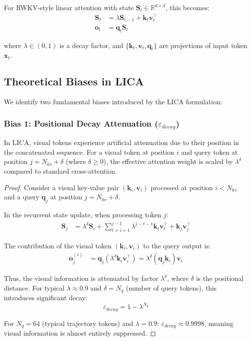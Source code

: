 For RWKV-style linear attention with state $\mathbf{S}_t \in \mathbb{R}^{d \times d}$, this becomes:
\begin{align}
\mathbf{S}_t &= \lambda \mathbf{S}_{t-1} + \mathbf{k}_t \mathbf{v}_t^\top \\
\mathbf{o}_t &= \mathbf{q}_t \mathbf{S}_t
\end{align}

where $\lambda \in (0,1)$ is a decay factor, and $\{\mathbf{k}_t, \mathbf{v}_t, \mathbf{q}_t\}$ are projections of input token $\mathbf{x}_t$.

\subsection{Theoretical Biases in LICA}

We identify two fundamental biases introduced by the LICA formulation:

\subsubsection{Bias 1: Positional Decay Attenuation ($\varepsilon_{decay}$)}

\begin{theorem}
In LICA, visual tokens experience artificial attenuation due to their position in the concatenated sequence. For a visual token at position $i$ and query token at position $j = N_{kv} + \delta$ (where $\delta \geq 0$), the effective attention weight is scaled by $\lambda^{\delta}$ compared to standard cross-attention.
\end{theorem}

\begin{proof}
Consider a visual key-value pair $(\mathbf{k}_i, \mathbf{v}_i)$ processed at position $i < N_{kv}$ and a query $\mathbf{q}_j$ at position $j = N_{kv} + \delta$.

In the recurrent state update, when processing token $j$:
\begin{align}
\mathbf{S}_j &= \lambda^{\delta} \mathbf{S}_i + \sum_{t=i+1}^{j-1} \lambda^{j-t-1} \mathbf{k}_t \mathbf{v}_t^\top + \mathbf{k}_j \mathbf{v}_j^\top
\end{align}

The contribution of the visual token $(\mathbf{k}_i, \mathbf{v}_i)$ to the query output is:
\begin{align}
\mathbf{o}_j^{(i)} &= \mathbf{q}_j (\lambda^{\delta} \mathbf{k}_i \mathbf{v}_i^\top) = \lambda^{\delta} (\mathbf{q}_j \mathbf{k}_i) \mathbf{v}_i
\end{align}

Thus, the visual information is attenuated by factor $\lambda^{\delta}$, where $\delta$ is the positional distance. For typical $\lambda \approx 0.9$ and $\delta = N_q$ (number of query tokens), this introduces significant decay:
\begin{equation}
\varepsilon_{decay} = 1 - \lambda^{N_q}
\end{equation}

For $N_q = 64$ (typical trajectory tokens) and $\lambda = 0.9$: $\varepsilon_{decay} \approx 0.9998$, meaning visual information is almost entirely suppressed.
\end{proof}

